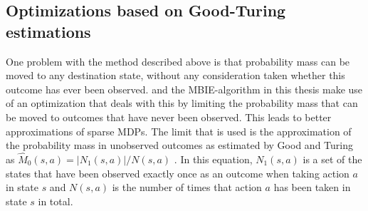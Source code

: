 \subsection{Optimizations based on Good-Turing estimations}

\label{sec:mbie_gt}

One problem with the method described above is that probability mass can be
moved to any destination state, without any consideration taken whether this
outcome has ever been observed. \textcite{dietterich2013pac} and the 
MBIE-algorithm in this thesis make use of an optimization that deals with this by 
limiting the probability mass that can be moved to outcomes that have never been 
observed. This leads to better approximations of sparse MDPs. The limit that is used is the 
approximation of the probability mass in unobserved outcomes as estimated by 
Good and Turing as $\hat{M}_0(s,a) = |N_1(s,a)| / N(s,a)$ \parencite{gtpaper}. 
In this equation, $N_1(s,a)$ is a set of the states that have been observed exactly
once as an outcome when taking action $a$ in state $s$ and $N(s,a)$ is the
number of times that action $a$ has been taken in state $s$ in total. 